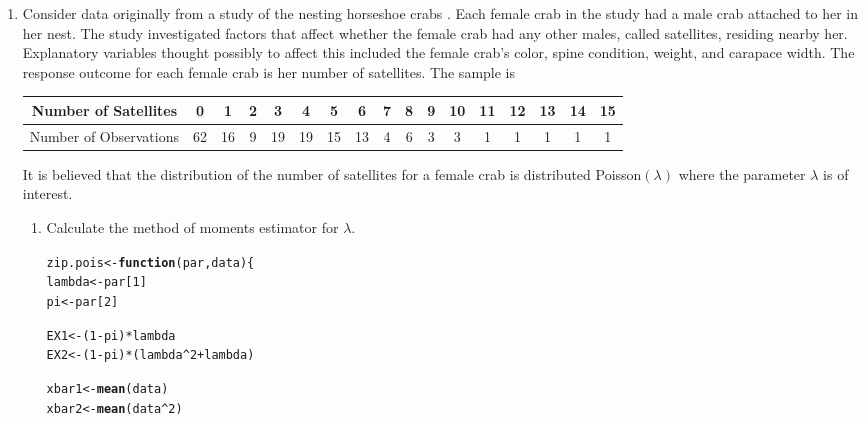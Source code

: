 \documentclass{article}\usepackage[]{graphicx}\usepackage[]{color}
\makeatletter
\newcommand{\hlnum}[1]{\textcolor[rgb]{0.686,0.059,0.569}{#1}}%
\newcommand{\hlopt}[1]{\textcolor[rgb]{0,0,0}{#1}}%
\newcommand{\hlstd}[1]{\textcolor[rgb]{0.345,0.345,0.345}{#1}}%
\newcommand{\hlkwa}[1]{\textcolor[rgb]{0.161,0.373,0.58}{\textbf{#1}}}%
\newcommand{\hlkwb}[1]{\textcolor[rgb]{0.69,0.353,0.396}{#1}}%
\newcommand{\hlkwc}[1]{\textcolor[rgb]{0.333,0.667,0.333}{#1}}%
\newcommand{\hlkwd}[1]{\textcolor[rgb]{0.737,0.353,0.396}{\textbf{#1}}}%
\newenvironment{kframe}{%
 \def\at@end@of@kframe{}%
 \ifinner\ifhmode%
  \def\at@end@of@kframe{\end{minipage}}%
  \begin{minipage}{\columnwidth}%
 \fi\fi%
 \def\FrameCommand##1{\hskip\@totalleftmargin \hskip-\fboxsep
 \colorbox{shadecolor}{##1}\hskip-\fboxsep
     \hskip-\linewidth \hskip-\@totalleftmargin \hskip\columnwidth}%
 \MakeFramed {\advance\hsize-\width
   \@totalleftmargin\z@ \linewidth\hsize
   \@setminipage}}%
 {\par\unskip\endMakeFramed%
 \at@end@of@kframe}
\newenvironment{knitrout}{}{} %
\makeatother
\begin{document}
\begin{enumerate}
\item Consider  data originally from a study of the nesting horseshoe crabs 
\citep{Brockmann96}. Each female crab in the study had a male crab attached to 
her in her nest. The study investigated factors that affect whether the female 
crab had any other males, called satellites, residing nearby her. Explanatory 
variables thought possibly to affect this included the female crab's color, 
spine condition, weight, and carapace width. The response outcome for each 
female crab is her number of satellites.
	 The sample is
	\begin{center}
		\begin{tabular}{|ccccccccccccccccc|}\hline
		 Number of Satellites& 0 & 1&  2&  3&  4&  5&  6&  7&  8&  9& 10& 11& 12& 13 &14& 15\\ \hline
		 Number of Observations&62& 16&  9& 19& 19& 15& 13&  4&  6&  3&  3&  1&  1&  1&  1&1\\\hline
 		\end{tabular}
	\end{center}
 	It is believed that the distribution of the number of satellites for a female 
 	crab is distributed Poisson$(\lambda)$ where the parameter $\lambda$ is of interest.
	\begin{enumerate}
	\item Calculate the method of moments estimator for $\lambda$.\\
\begin{knitrout}
\color{fgcolor}\begin{kframe}
\begin{alltt}
\hlstd{zip.pois} \hlkwb{<-} \hlkwa{function}\hlstd{(}\hlkwc{par}\hlstd{,} \hlkwc{data}\hlstd{)\{}
  \hlstd{lambda} \hlkwb{<-} \hlstd{par[}\hlnum{1}\hlstd{]}
  \hlstd{pi} \hlkwb{<-} \hlstd{par[}\hlnum{2}\hlstd{]}

  \hlstd{EX1} \hlkwb{<-} \hlstd{(}\hlnum{1}\hlopt{-}\hlstd{pi)}\hlopt{*}\hlstd{lambda}
  \hlstd{EX2} \hlkwb{<-} \hlstd{(}\hlnum{1}\hlopt{-}\hlstd{pi)}\hlopt{*}\hlstd{(lambda}\hlopt{^}\hlnum{2}\hlopt{+}\hlstd{lambda)}

  \hlstd{xbar1} \hlkwb{<-} \hlkwd{mean}\hlstd{(data)}
  \hlstd{xbar2} \hlkwb{<-} \hlkwd{mean}\hlstd{(data}\hlopt{^}\hlnum{2}\hlstd{)}


\end{alltt}
\end{kframe}
\end{knitrout}
\end{enumerate}
\end{enumerate}
\end{document}
